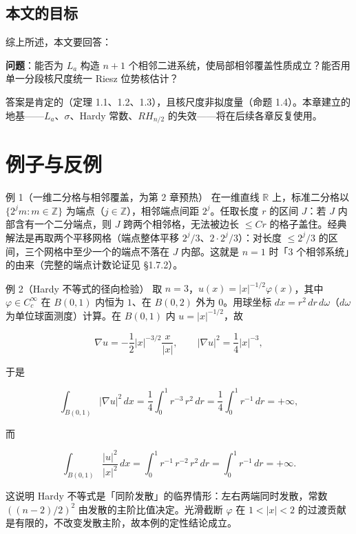 \documentclass[a4paper,11pt,openany]{ctexbook}
\numberwithin{equation}{chapter}
\numberwithin{figure}{chapter}
\numberwithin{table}{chapter}
\begin{document}
\subsection{本文的目标}

综上所述，本文要回答：

\begin{quotebox}
\textbf{问题}：能否为 $L_a$ 构造 $n+1$ 个相邻二进系统，使局部相邻覆盖性质成立？能否用单一分段核尺度统一 Riesz 位势核估计？
\end{quotebox}

答案是肯定的（定理 1.1、1.2、1.3），且核尺度非拟度量（命题 1.4）。本章建立的地基——$L_a$、$\sigma$、Hardy 常数、$RH_{n/2}$ 的失效——将在后续各章反复使用。

\section{例子与反例}

\begin{examplebox}{例 1（一维二分格与相邻覆盖，为第 2 章预热）}
在一维直线 $\mathbb R$ 上，标准二分格以 $\{2^j m : m\in\mathbb Z\}$ 为端点（$j\in\mathbb Z$），相邻端点间距 $2^j$。任取长度 $r$ 的区间 $J$：若 $J$ 内部含有一个二分端点，则 $J$ 跨两个相邻格，无法被边长 $\le Cr$ 的格子盖住。经典解法是再取两个平移网格（端点整体平移 $2^j/3$、$2\cdot 2^j/3$）：对长度 $\le 2^j/3$ 的区间，三个网格中至少一个的端点不落在 $J$ 内部。这就是 $n=1$ 时「$3$ 个相邻系统」的由来（完整的端点计数论证见 §1.7.2）。
\end{examplebox}

\begin{examplebox}{例 2（Hardy 不等式的径向检验）}
取 $n=3$，$u(x)=|x|^{-1/2}\varphi(x)$，其中 $\varphi\in C_c^\infty$ 在 $B(0,1)$ 内恒为 $1$、在 $B(0,2)$ 外为 $0$。用球坐标 $dx=r^{2}\,dr\,d\omega$（$d\omega$ 为单位球面测度）计算。在 $B(0,1)$ 内 $u=|x|^{-1/2}$，故
\end{examplebox}

$$\nabla u = -\frac12 |x|^{-3/2}\frac{x}{|x|},\qquad |\nabla u|^2=\frac14|x|^{-3},$$

于是

$$\int_{B(0,1)}|\nabla u|^2\,dx = \frac14\int_0^1 r^{-3}\,r^2\,dr = \frac14\int_0^1 r^{-1}\,dr = +\infty,$$

而

$$\int_{B(0,1)}\frac{|u|^2}{|x|^2}\,dx = \int_0^1 r^{-1}\,r^{-2}\,r^2\,dr = \int_0^1 r^{-1}\,dr = +\infty.$$

这说明 Hardy 不等式是「同阶发散」的临界情形：左右两端同时发散，常数 $((n-2)/2)^2$ 由发散的主阶比值决定。光滑截断 $\varphi$ 在 $1<|x|<2$ 的过渡贡献是有限的，不改变发散主阶，故本例的定性结论成立。
\end{document}
